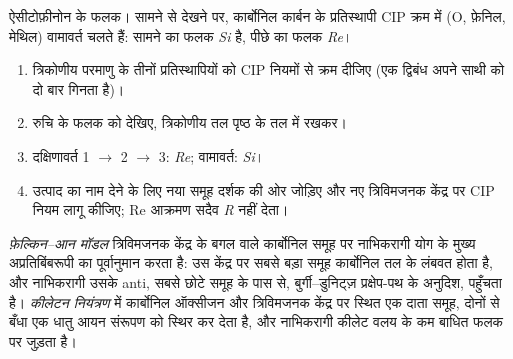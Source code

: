 \begin{omfigure}

{\small ऐसीटोफ़ीनोन के फलक। सामने से देखने पर, कार्बोनिल कार्बन के प्रतिस्थापी
CIP क्रम में (O, फ़ेनिल, मेथिल) वामावर्त चलते हैं: सामने का
फलक \textit{Si} है, पीछे का फलक \textit{Re}।}
\end{omfigure}

\begin{method}[Re और Si फलकों का निर्धारण]\label{met:b3:asymmetric-synthesis:re-si}
\begin{enumerate}
  \item त्रिकोणीय परमाणु के तीनों प्रतिस्थापियों को CIP नियमों से क्रम दीजिए (एक
        द्विबंध अपने साथी को दो बार गिनता है)।
  \item रुचि के फलक को देखिए, त्रिकोणीय तल पृष्ठ के तल में रखकर।
  \item दक्षिणावर्त 1 $\to$ 2 $\to$ 3: \textit{Re}; वामावर्त: \textit{Si}।
  \item उत्पाद का नाम देने के लिए नया समूह दर्शक की ओर जोड़िए और
        नए त्रिविमजनक केंद्र पर CIP नियम लागू कीजिए; Re आक्रमण सदैव \textit{R} नहीं देता।
\end{enumerate}
\end{method}

\begin{definition}[फ़ेल्किन--आन मॉडल और कीलेटन नियंत्रण]\label{def:b3:asymmetric-synthesis:felkin}
\emph{फ़ेल्किन--आन मॉडल} त्रिविमजनक केंद्र के बगल वाले
कार्बोनिल समूह पर नाभिकरागी योग के मुख्य
अप्रतिबिंबरूपी का पूर्वानुमान करता है: उस केंद्र पर सबसे बड़ा समूह
कार्बोनिल तल के लंबवत होता है, और नाभिकरागी उसके anti, सबसे छोटे
समूह के पास से, बुर्गी--डुनिट्ज़ प्रक्षेप-पथ के अनुदिश, पहुँचता है। \emph{कीलेटन
नियंत्रण} में कार्बोनिल ऑक्सीजन और त्रिविमजनक केंद्र पर स्थित
एक दाता समूह, दोनों से बँधा एक धातु आयन संरूपण को स्थिर कर देता है, और
नाभिकरागी कीलेट वलय के कम बाधित फलक पर जुड़ता है।
\end{definition}

